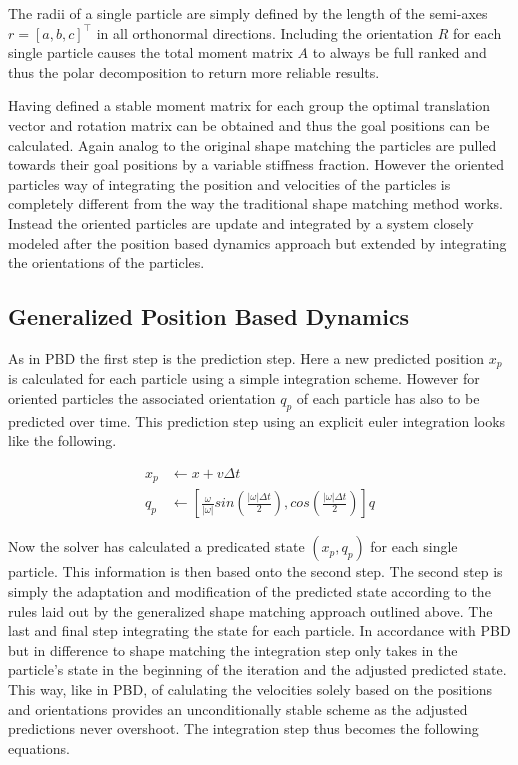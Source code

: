 The radii of a single particle are simply defined by the length of the semi-axes $r = [a,b,c]^\top$ in all orthonormal directions. Including the orientation $R$ for each single particle causes the total moment matrix $A$ to always be full ranked and thus the polar decomposition to return more reliable results.

Having defined a stable moment matrix for each group the optimal translation vector and rotation matrix can be obtained and thus the goal positions can be calculated. Again analog to the original shape matching the particles are pulled towards their goal positions by a variable stiffness fraction. However the oriented particles way of integrating the position and velocities of the particles is completely different from the way the traditional shape matching method works. Instead the oriented particles are update and integrated by a system closely modeled after the position based dynamics approach but extended by integrating the orientations of the particles.

\subsection{Generalized Position Based Dynamics}
As in PBD the first step is the prediction step. Here a new predicted position $x_p$ is calculated for each particle using a simple integration scheme. However for oriented particles the associated orientation $q_p$ of each particle has also to be predicted over time. This prediction step using an explicit euler integration looks like the following.

\begin{align}
x_p &\leftarrow x + v\Delta t \\
q_p &\leftarrow [\frac{\omega}{|\omega|}sin(\frac{|\omega|\Delta t}{2}), cos(\frac{|\omega|\Delta t}{2})]q
\end{align}

Now the solver has calculated a predicated state $(x_p,q_p)$ for each single particle. This information is then based onto the second step. The second step is simply the adaptation and modification of the predicted state according to the rules laid out by the generalized shape matching approach outlined above. The last and final step integrating the state for each particle. In accordance with PBD but in difference to shape matching the integration step only takes in the particle's state in the beginning of the iteration and the adjusted predicted state. This way, like in PBD, of calulating the velocities solely based on the positions and orientations provides an unconditionally stable scheme as the adjusted predictions never overshoot. The integration step thus becomes the following equations.


